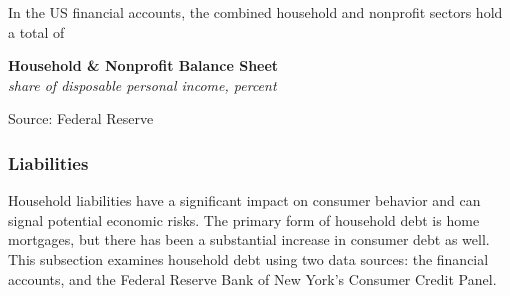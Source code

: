 \documentclass{report}
\makeatletter
\newcommand{\tbllink}[1]{\href{https://raw.githubusercontent.com/bdecon/US-chartbook/master/chartbook/data/#1}{\faTable}}
\newcommand*\short[1]{\expandafter\@gobbletwo\number\numexpr#1\relax}
\newcommand{\absnode}[3]{\node[below right, align=left] at (axis cs: #1,#2) {#3};}
\newcommand{\shdateaxisticks}{
		date coordinates in=x, axis line style={draw=none},
		xmax={2023-11-30},
		max space between ticks=40,	    
		xtick={{1990-01-01}, {1995-01-01}, {2000-01-01}, 
			{2005-01-01}, {2010-01-01}, {2015-01-01}, {2020-01-01}},
		minor xtick={},
		enlarge y limits={0.06}, enlarge x limits={0.01},
		xticklabel style={align=center, yshift=-2pt}, tick label style={inner sep=0pt},
		}
\newcommand{\bbar}[2]{extra #1 ticks = {{#2}}, extra #1 tick labels = ,
		extra #1 tick style = {grid=major, grid style={thick, black!25}},}
\newcommand{\stdline}[4]{\addplot[very thick, no markers, color=#1] 
		table [x=#2, y=#3, col sep=comma] {#4};	}
\newcommand{\thickline}[4]{\addplot[ultra thick, no markers, color=#1] 
		table [x=#2, y=#3, col sep=comma] {#4};	}
\newcommand{\rbars}{
		\fill[color=black!10] (axis cs:{1990-07-01},\pgfkeysvalueof{/pgfplots/ymin}) rectangle 
			(axis cs:{1991-03-01}, \pgfkeysvalueof{/pgfplots/ymax});
		\fill[color=black!10] (axis cs:{2007-12-01},\pgfkeysvalueof{/pgfplots/ymin}) rectangle 
			(axis cs:{2009-07-01}, \pgfkeysvalueof{/pgfplots/ymax});
		\fill[color=black!10] (axis cs:{2001-03-01},\pgfkeysvalueof{/pgfplots/ymin}) rectangle 
			(axis cs:{2001-11-01}, \pgfkeysvalueof{/pgfplots/ymax});
		\fill[color=black!10] (axis cs:{2020-02-01},\pgfkeysvalueof{/pgfplots/ymin}) rectangle 
			(axis cs:{2020-05-01}, \pgfkeysvalueof{/pgfplots/ymax});}
\makeatother
\begin{document}
{\begin{minipage}{0.76\textwidth}
In the US financial accounts, the combined household and nonprofit sectors hold a total of 
\end{minipage}

\begin{minipage}{0.33\textwidth}
\small 
\end{minipage} \hspace{5mm}
\begin{minipage}{0.39\textwidth}
\normalsize \textbf{Household \& Nonprofit Balance Sheet}\\
\footnotesize{\textit{share of disposable personal income, percent}}
\vspace{3.1cm}

\hspace{5mm} 

\footnotesize{Source: Federal Reserve} \hfill \tbllink{for.csv}
\end{minipage}

\begin{minipage}{0.76\textwidth}
\subsubsection*{Liabilities}

\small Household liabilities have a significant impact on consumer behavior and can signal potential economic risks. The primary form of household debt is home mortgages, but there has been a substantial increase in consumer debt as well. This subsection examines household debt using two data sources: the financial accounts, and the Federal Reserve Bank of New York's Consumer Credit Panel.


\end{minipage}}
\end{document}
